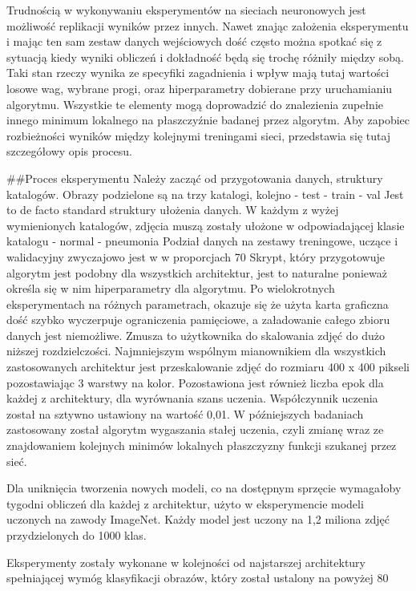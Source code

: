 \documentclass[12pt,a4paper,twoside,titlepage,openright]{book}
\begin{document}
Trudnością  w wykonywaniu eksperymentów na sieciach neuronowych jest możliwość replikacji wyników przez innych. Nawet znając założenia eksperymentu i mając ten sam zestaw danych wejściowych dość często można spotkać się z sytuacją kiedy wyniki obliczeń i dokładność będą się trochę różniły między sobą. Taki stan rzeczy wynika ze specyfiki zagadnienia i wpływ mają tutaj wartości losowe wag, wybrane progi, oraz hiperparametry dobierane przy uruchamianiu algorytmu. Wszystkie te elementy mogą doprowadzić do znalezienia zupełnie innego minimum lokalnego na płaszczyźnie badanej przez algorytm. Aby zapobiec rozbieżności wyników między kolejnymi treningami sieci, przedstawia się tutaj szczegółowy opis procesu.

##Proces eksperymentu
Należy zacząć od przygotowania danych, struktury katalogów. Obrazy podzielone są na trzy katalogi, kolejno 
- test
- train
- val
Jest to de facto standard struktury ułożenia danych. W każdym z wyżej wymienionych katalogów, zdjęcia muszą zostały ułożone w odpowiadającej klasie katalogu
- normal
- pneumonia
Podział danych na zestawy treningowe, uczące i walidacyjny zwyczajowo jest w w proporcjach 70%
Skrypt, który przygotowuje algorytm jest podobny dla wszystkich architektur, jest to naturalne ponieważ określa się w nim hiperparametry dla algorytmu. Po wielokrotnych eksperymentach na różnych parametrach, okazuje się że użyta karta graficzna dość szybko wyczerpuje ograniczenia pamięciowe, a załadowanie całego zbioru danych jest niemożliwe. Zmusza to użytkownika do skalowania zdjęć do dużo niższej rozdzielczości. Najmniejszym wspólnym mianownikiem dla wszystkich zastosowanych architektur jest przeskalowanie zdjęć do rozmiaru 400 x 400 pikseli pozostawiając 3 warstwy na kolor. Pozostawiona jest również liczba epok dla każdej z architektury, dla wyrównania szans uczenia. Współczynnik uczenia został na sztywno ustawiony na wartość 0,01. W późniejszych badaniach zastosowany został algorytm wygaszania stałej uczenia, czyli zmianę wraz ze znajdowaniem kolejnych minimów lokalnych płaszczyzny funkcji szukanej przez sieć.

Dla uniknięcia tworzenia nowych modeli, co na dostępnym sprzęcie wymagałoby tygodni obliczeń dla każdej z architektur, użyto w eksperymencie modeli uczonych na zawody ImageNet. Każdy model jest uczony na 1,2 miliona zdjęć przydzielonych do 1000 klas. 

Eksperymenty zostały wykonane w kolejności od najstarszej architektury spełniającej wymóg klasyfikacji obrazów, który został ustalony na powyżej 80%
\end{document}
